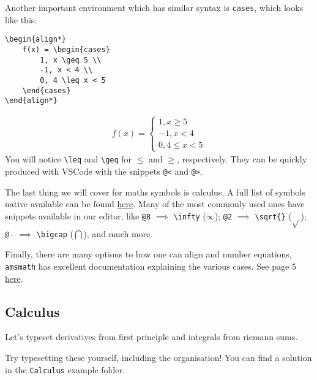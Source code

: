 Another important environment which has similar syntax is \verb|cases|, which looks like this:
\begin{lstlisting}
\begin{align*}
    f(x) = \begin{cases}
        1, x \geq 5 \\
        -1, x < 4 \\
        0, 4 \leq x < 5  
    \end{cases}
\end{align*}
\end{lstlisting}
\begin{align*}
    f(x) = \begin{cases}
        1, x \geq 5 \\
        -1, x < 4 \\
        0, 4 \leq x < 5  
    \end{cases}
\end{align*}
You will notice \verb|\leq| and \verb|\geq| for \( \leq \) and \( \geq \), respectively.
They can be quickly produced with VSCode with the snippets \verb|@<| and \verb|@>|.

The last thing we will cover for maths symbols is calculus.
A full list of symbols native available can be found \href{https://oeis.org/wiki/List_of_LaTeX_mathematical_symbols}{here}.
Many of the most commonly used ones have snippets available in our editor, like \verb|@8| \( \implies \) \verb|\infty| (\( \infty\)); \verb|@2| \( \implies \) \verb|\sqrt{}| (\(\sqrt{} \)); \verb|@-| \( \implies \) \verb|\bigcap| (\( \bigcap \)), and much more.

Finally, there are many options to how one can align and number equations, \texttt{amsmath} has excellent documentation explaining the various cases.
See page 5 \href{https://anorien.csc.warwick.ac.uk/mirrors/CTAN/macros/latex/required/amsmath/amsldoc.pdf}{here}.

\subsection{Calculus}
Let's typeset derivatives from first principle and integrals from riemann sums.

Try typesetting these yourself, including the organisation! You can find a solution in the \texttt{Calculus} example folder.

